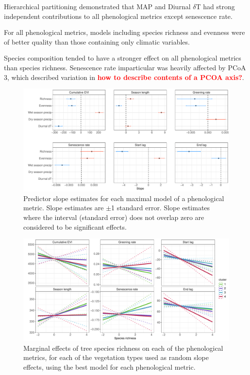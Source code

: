 \documentclass[11pt,a4paper]{article}
\newcommand{\todo}[1]{\textcolor{red}{\textbf{#1}}}   %
\begin{document}
Hierarchical partitioning demonstrated that MAP and Diurnal $\delta$T had strong independent contributions to all phenological metrics except senescence rate. 

For all phenological metrics, models including species richness and evenness were of better quality than those containing only climatic variables.  

Species composition tended to have a stronger effect on all phenological metrics than species richness. Senescence rate imparticular was heavily affected by PCoA 3, which described variation in \todo{how to describe contents of a PCOA axis?}.


 

\begin{figure}[H]
\centering
	\includegraphics[width=\textwidth]{mod_slopes.pdf}
	\caption{Predictor slope estimates for each maximal model of a phenological metric. Slope estimates are $\pm$1 standard error. Slope estimates where the interval (standard error) does not overlap zero are considered to be significant effects.}
	\label{mod_slopes}
\end{figure}

\begin{figure}[H]
\centering
	\includegraphics[width=\textwidth]{mod_marg.pdf}
	\caption{Marginal effects of tree species richness on each of the phenological metrics, for each of the vegetation types used as random slope effects, using the best model for each phenological metric.}
	\label{mod_marg}
\end{figure}
\end{document}
